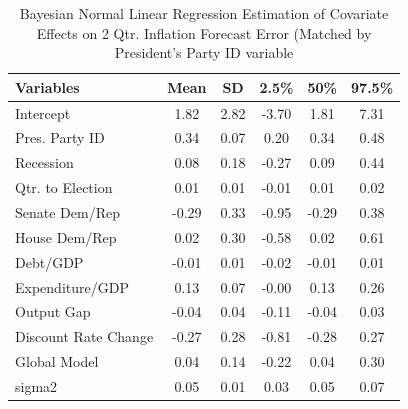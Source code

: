 \documentclass[a4paper]{article}\usepackage{graphicx, color}
\begin{document}


\begin{table}[ht]
\begin{center}
\caption{Bayesian Normal Linear Regression Estimation of Covariate Effects on 2 Qtr. Inflation Forecast Error (Matched by President's Party ID variable}
\label{OutputPB}
{\small
\begin{tabular}{lccccc}
  \hline
Variables & Mean & SD & 2.5\% & 50\% & 97.5\% \\ 
  \hline
Intercept & 1.82 & 2.82 & -3.70 & 1.81 & 7.31 \\ 
  Pres. Party ID & 0.34 & 0.07 & 0.20 & 0.34 & 0.48 \\ 
  Recession & 0.08 & 0.18 & -0.27 & 0.09 & 0.44 \\ 
  Qtr. to Election & 0.01 & 0.01 & -0.01 & 0.01 & 0.02 \\ 
  Senate Dem/Rep & -0.29 & 0.33 & -0.95 & -0.29 & 0.38 \\ 
  House Dem/Rep & 0.02 & 0.30 & -0.58 & 0.02 & 0.61 \\ 
  Debt/GDP & -0.01 & 0.01 & -0.02 & -0.01 & 0.01 \\ 
  Expenditure/GDP & 0.13 & 0.07 & -0.00 & 0.13 & 0.26 \\ 
  Output Gap & -0.04 & 0.04 & -0.11 & -0.04 & 0.03 \\ 
  Discount Rate Change & -0.27 & 0.28 & -0.81 & -0.28 & 0.27 \\ 
  Global Model & 0.04 & 0.14 & -0.22 & 0.04 & 0.30 \\ 
  sigma2 & 0.05 & 0.01 & 0.03 & 0.05 & 0.07 \\ 
   \hline
\end{tabular}
}
\end{center}
\end{table}





\clearpage



\end{document}
